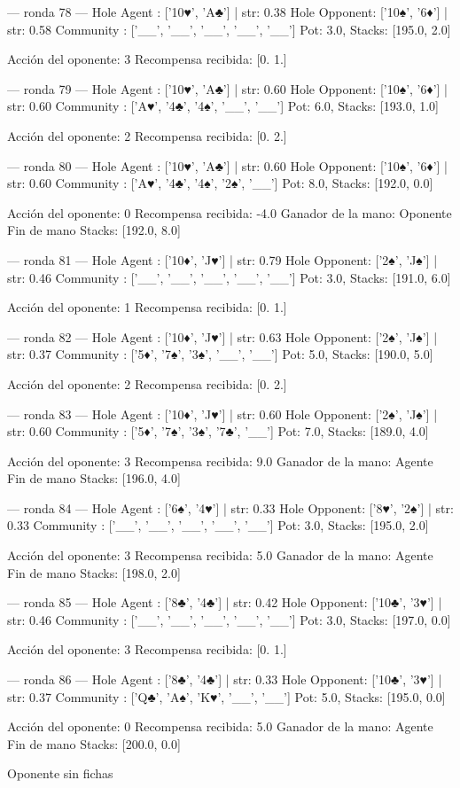 --- ronda 78 ---
Hole Agent : ['10♥', 'A♣'] | str: 0.38
Hole Opponent: ['10♠', '6♦'] | str: 0.58
Community  : ['__', '__', '__', '__', '__']
Pot: 3.0, Stacks: [195.0, 2.0]

Acción del oponente: 3
Recompensa recibida: [0. 1.]

--- ronda 79 ---
Hole Agent : ['10♥', 'A♣'] | str: 0.60
Hole Opponent: ['10♠', '6♦'] | str: 0.60
Community  : ['A♥', '4♣', '4♠', '__', '__']
Pot: 6.0, Stacks: [193.0, 1.0]

Acción del oponente: 2
Recompensa recibida: [0. 2.]

--- ronda 80 ---
Hole Agent : ['10♥', 'A♣'] | str: 0.60
Hole Opponent: ['10♠', '6♦'] | str: 0.60
Community  : ['A♥', '4♣', '4♠', '2♠', '__']
Pot: 8.0, Stacks: [192.0, 0.0]

Acción del oponente: 0
Recompensa recibida: -4.0
Ganador de la mano: Oponente
Fin de mano Stacks: [192.0, 8.0]


--- ronda 81 ---
Hole Agent : ['10♦', 'J♥'] | str: 0.79
Hole Opponent: ['2♠', 'J♠'] | str: 0.46
Community  : ['__', '__', '__', '__', '__']
Pot: 3.0, Stacks: [191.0, 6.0]

Acción del oponente: 1
Recompensa recibida: [0. 1.]

--- ronda 82 ---
Hole Agent : ['10♦', 'J♥'] | str: 0.63
Hole Opponent: ['2♠', 'J♠'] | str: 0.37
Community  : ['5♦', '7♠', '3♠', '__', '__']
Pot: 5.0, Stacks: [190.0, 5.0]

Acción del oponente: 2
Recompensa recibida: [0. 2.]

--- ronda 83 ---
Hole Agent : ['10♦', 'J♥'] | str: 0.60
Hole Opponent: ['2♠', 'J♠'] | str: 0.60
Community  : ['5♦', '7♠', '3♠', '7♣', '__']
Pot: 7.0, Stacks: [189.0, 4.0]

Acción del oponente: 3
Recompensa recibida: 9.0
Ganador de la mano: Agente
Fin de mano Stacks: [196.0, 4.0]


--- ronda 84 ---
Hole Agent : ['6♠', '4♥'] | str: 0.33
Hole Opponent: ['8♥', '2♠'] | str: 0.33
Community  : ['__', '__', '__', '__', '__']
Pot: 3.0, Stacks: [195.0, 2.0]

Acción del oponente: 3
Recompensa recibida: 5.0
Ganador de la mano: Agente
Fin de mano Stacks: [198.0, 2.0]


--- ronda 85 ---
Hole Agent : ['8♣', '4♣'] | str: 0.42
Hole Opponent: ['10♣', '3♥'] | str: 0.46
Community  : ['__', '__', '__', '__', '__']
Pot: 3.0, Stacks: [197.0, 0.0]

Acción del oponente: 3
Recompensa recibida: [0. 1.]

--- ronda 86 ---
Hole Agent : ['8♣', '4♣'] | str: 0.33
Hole Opponent: ['10♣', '3♥'] | str: 0.37
Community  : ['Q♣', 'A♠', 'K♥', '__', '__']
Pot: 5.0, Stacks: [195.0, 0.0]

Acción del oponente: 0
Recompensa recibida: 5.0
Ganador de la mano: Agente
Fin de mano Stacks: [200.0, 0.0]


Oponente sin fichas
